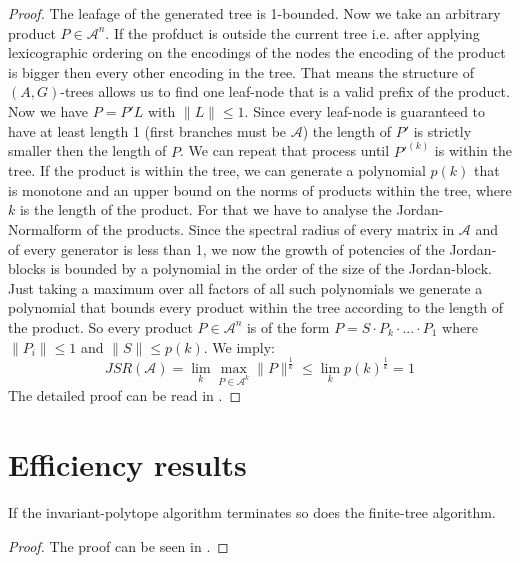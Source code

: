 \begin{proof}
    The leafage of the generated tree is 1-bounded. Now we take an arbitrary product $P \in \mathcal{A}^n$.
    If the profduct is outside the current tree i.e. after applying lexicographic ordering on the encodings of the nodes the encoding of the product is bigger then every other encoding in the tree. 
    That means the structure of $(A,G)$-trees allows us to find one leaf-node that is a valid prefix of the product. Now we have $P = P'L$ with $\lVert L \rVert \le 1$. Since every leaf-node is guaranteed to have at least length 1 (first branches must be $\mathcal{A}$) the length of $P'$ is strictly smaller then the length of $P$. We can repeat that process until $P'^{(k)}$ is within the tree.
    If the product is within the tree, we can generate a polynomial $p(k)$ that is monotone and an upper bound on the norms of products within the tree, where $k$ is the length of the product. 
    For that we have to analyse the Jordan-Normalform of the products. Since the spectral radius of every matrix in $\mathcal{A}$ and of every generator is less than 1, we now the growth of potencies of the Jordan-blocks is bounded by a polynomial in the order of the size of the Jordan-block. Just taking a maximum over all factors of all such polynomials we generate a polynomial that bounds every product within the tree according to the length of the product.  
    So every product $P \in \mathcal{A}^n$ is of the form $P = S \cdot P_k \cdot ... \cdot P_1$ where $\lVert P_i \rVert \le 1$ and $\lVert S \rVert \le p(k)$. We imply: 
    $$JSR(\mathcal{A}) = \lim_k \max_{P \in \mathcal{A}^k} \lVert P \rVert ^{\frac{1}{k}} \leq \lim_k p(k) ^{\frac{1}{k}}  = 1$$
    The detailed proof can be read in \citep{mollerTreebasedApproachJoint2014}. 
\end{proof}

\section{Efficiency results}

\begin{theorem}
    \label{thm:same_solution}
    If the invariant-polytope algorithm terminates so does the finite-tree algorithm.
\end{theorem}

\begin{proof}
    The proof can be seen in \citep{mollerTreebasedApproachJoint2014}.
\end{proof}


